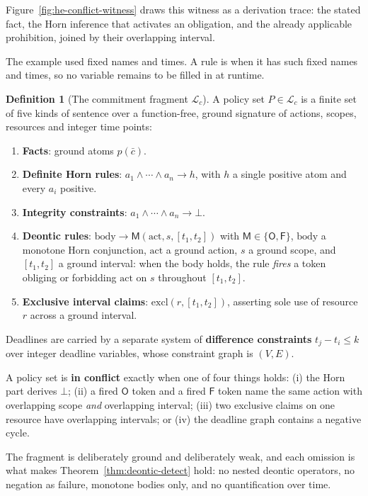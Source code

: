 \documentclass[11pt,a4paper]{article}
\theoremstyle{definition}
\newtheorem{definition}{Definition}[section]
\theoremstyle{definition}
\theoremstyle{remark}
\begin{document}
Figure~\ref{fig:he-conflict-witness} draws this witness as a derivation
trace: the stated fact, the Horn inference that activates an obligation,
and the already applicable prohibition, joined by their overlapping interval.



The example used fixed names and times. A rule is  when it
has such fixed names and times, so no variable remains to be filled in at
runtime.

\begin{definition}[The commitment fragment $\mathcal{L}_c$]\label{def:lc-fragment}
\pdstatus{\Designed}{}
\setlength{\parskip}{4pt plus 1pt}
A policy set $P \in \mathcal{L}_c$ is a finite set of five kinds of sentence over
a function-free, ground signature of actions, scopes, resources and integer time
points:
\begin{enumerate}[leftmargin=1.8em,itemsep=1pt]
  \item \textbf{Facts}: ground atoms $p(\bar{c})$.
  \item \textbf{Definite Horn rules}: $a_1 \wedge \cdots \wedge a_n \to h$,
  with $h$ a single positive atom and every $a_i$ positive.
  \item \textbf{Integrity constraints}: $a_1 \wedge \cdots \wedge a_n \to
  \bot$.
  \item \textbf{Deontic rules}:
  $\mathrm{body} \to \mathsf{M}(\mathrm{act}, s, [t_1,t_2])$ with
  $\mathsf{M} \in \{\mathsf{O},\mathsf{F}\}$, $\mathrm{body}$ a monotone Horn
  conjunction, $\mathrm{act}$ a ground action, $s$ a ground scope, and
  $[t_1,t_2]$ a ground interval: when the body holds, the rule \emph{fires} a
  token obliging or forbidding $\mathrm{act}$ on $s$ throughout $[t_1,t_2]$.
  \item \textbf{Exclusive interval claims}: $\mathrm{excl}(r,[t_1,t_2])$,
  asserting sole use of resource $r$ across a ground interval.


\end{enumerate}
Deadlines are carried by a separate system of \textbf{difference constraints}
$t_j - t_i \le k$ over integer deadline variables, whose constraint graph is
$(V,E)$.

A policy set is \textbf{in conflict} exactly when one of four things holds:
(i) the Horn part derives $\bot$; (ii) a fired $\mathsf{O}$ token and a fired
$\mathsf{F}$ token name the same action with overlapping scope \emph{and}
overlapping interval; (iii) two exclusive claims on one resource have
overlapping intervals; or (iv) the deadline graph contains a negative cycle.

The fragment is deliberately ground and deliberately weak, and each omission is
what makes Theorem~\ref{thm:deontic-detect} hold: no nested deontic operators, no
negation as failure, monotone bodies only, and no quantification over time.
\end{definition}
\end{document}
